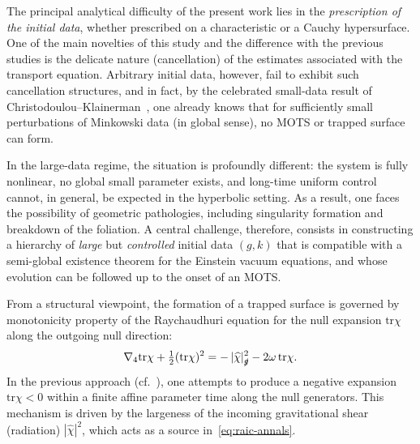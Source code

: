\documentclass{amsart}
\newcommand{\tr}{\mbox{tr}}
\begin{document}
\noindent The principal analytical difficulty of the present work lies in the \emph{prescription of the initial data}, whether prescribed on a characteristic or a Cauchy hypersurface. One of the main novelties of this study and the difference with the previous studies is the delicate nature (cancellation) of the estimates associated with the transport equation. Arbitrary initial data, however, fail to exhibit such cancellation structures, and in fact, by the celebrated small-data result of Christodoulou--Klainerman~\cite{christodoulou}, one already knows that for sufficiently small perturbations of Minkowski data (in global sense), no MOTS or trapped surface can form. 

\noindent In the large-data regime, the situation is profoundly different: the system is fully nonlinear, no global small parameter exists, and long-time uniform control cannot, in general, be expected in the hyperbolic setting. As a result, one faces the possibility of geometric pathologies, including singularity formation and breakdown of the foliation. A central challenge, therefore, consists in constructing a hierarchy of \emph{large} but \emph{controlled} initial data $(g,k)$ that is compatible with a semi-global existence theorem for the Einstein vacuum equations, and whose evolution can be followed up to the onset of an MOTS.

\medskip
\noindent
From a structural viewpoint, the formation of a trapped surface is governed by monotonicity property of the Raychaudhuri equation for the null expansion $\tr\chi$ along the outgoing null direction:
\begin{equation}
\label{eq:raic-annals}
\nabla_{4}\tr\chi + \tfrac{1}{2}(\tr\chi)^{2} = -\,|\widehat{\chi}|^{2}_{\slashed{g}} - 2\omega\,\tr\chi.
\end{equation}
In the previous approach (cf.~\cite{C91,Kl-Rod,A19,AnThesis}), one attempts to produce a negative expansion $\tr\chi<0$ within a finite affine parameter time along the null generators. This mechanism is driven by the largeness of the incoming gravitational shear (radiation) $|\widehat{\chi}|^{2}$, which acts as a source in~\eqref{eq:raic-annals}. 
\end{document}
